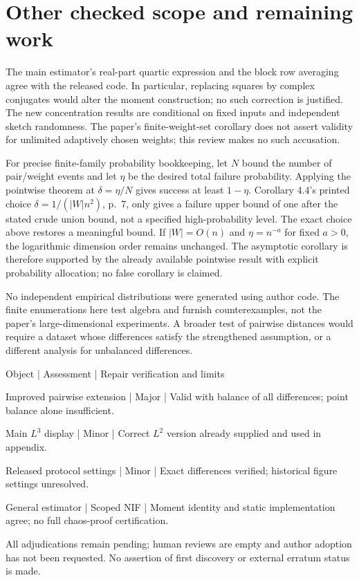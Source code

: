 \documentclass[10pt]{article}
\begin{document}
\section*{Other checked scope and remaining work}
The main estimator’s real-part quartic expression and the block row averaging agree with the released code. In particular, replacing squares by complex conjugates would alter the moment construction; no such correction is justified. The new concentration results are conditional on fixed inputs and independent sketch randomness. The paper’s finite-weight-set corollary does not assert validity for unlimited adaptively chosen weights; this review makes no such accusation.\par
For precise finite-family probability bookkeeping, let \(N\) bound the number of pair/weight events and let \(\eta\) be the desired total failure probability. Applying the pointwise theorem at \(\delta=\eta/N\) gives success at least \(1-\eta\). Corollary 4.4’s printed choice \(\delta=1/(|W|n^2)\), p. 7, only gives a failure upper bound of one after the stated crude union bound, not a specified high-probability level. The exact choice above restores a meaningful bound. If \(|W|=O(n)\) and \(\eta=n^{-a}\) for fixed \(a>0\), the logarithmic dimension order remains unchanged. The asymptotic corollary is therefore supported by the already available pointwise result with explicit probability allocation; no false corollary is claimed.\par
No independent empirical distributions were generated using author code. The finite enumerations here test algebra and furnish counterexamples, not the paper’s large-dimensional experiments. A broader test of pairwise distances would require a dataset whose differences satisfy the strengthened assumption, or a different analysis for unbalanced differences.\par
Object | Assessment | Repair verification and limits\par
Improved pairwise extension | Major | Valid with balance of all differences; point balance alone insufficient.\par
Main \(L^3\) display | Minor | Correct \(L^2\) version already supplied and used in appendix.\par
Released protocol settings | Minor | Exact differences verified; historical figure settings unresolved.\par
General estimator | Scoped NIF | Moment identity and static implementation agree; no full chaos-proof certification.\par
All adjudications remain pending; human reviews are empty and author adoption has not been requested. No assertion of first discovery or external erratum status is made.\par
\end{document}
